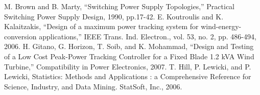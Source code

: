 \begin{thebibliography}{}
M. Brown and B. Marty, “Switching Power Supply Topologies,” Practical Switching Power Supply Design, 1990, pp.17-42.
E. Koutroulis and K. Kalaitzakis, “Design of a maximum power tracking system for wind-energy-conversion applications,” IEEE Trans. Ind. Electron., vol. 53, no. 2, pp. 486-494, 2006.
H. Gitano, G. Horizon, T. Soib, and K. Mohammad, “Design and Testing of a Low Cost Peak-Power Tracking Controller for a Fixed Blade 1.2 kVA Wind Turbine,”  Compatibility in Power Electronics, 2007.
T. Hill, P. Lewicki, and P. Lewicki, Statistics: Methods and Applications : a Comprehensive Reference for Science, Industry, and Data Mining. StatSoft, Inc., 2006.
\end{thebibliography}



